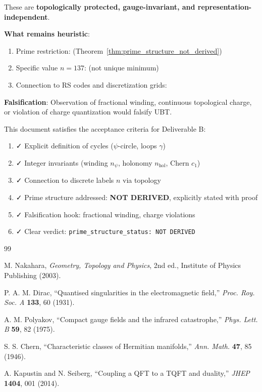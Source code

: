 \documentclass[12pt]{article}
\begin{document}
These are \textbf{topologically protected, gauge-invariant, and representation-independent}.

\textbf{What remains heuristic}:
\begin{enumerate}
    \item Prime restriction:  (Theorem~\ref{thm:prime_structure_not_derived})
    \item Specific value $n=137$:  (not unique minimum)
    \item Connection to RS codes and discretization grids: 
\end{enumerate}

\textbf{Falsification}: Observation of fractional winding, continuous topological charge, or violation of charge quantization would falsify UBT.

This document satisfies the acceptance criteria for Deliverable B:
\begin{enumerate}
    \item ✓ Explicit definition of cycles ($\psi$-circle, loops $\gamma$)
    \item ✓ Integer invariants (winding $n_\psi$, holonomy $n_{\text{hol}}$, Chern $c_1$)
    \item ✓ Connection to discrete labels $n$ via topology
    \item ✓ Prime structure addressed: \textbf{NOT DERIVED}, explicitly stated with proof
    \item ✓ Falsification hook: fractional winding, charge violations
    \item ✓ Clear verdict: \texttt{prime\_structure\_status: NOT DERIVED}
\end{enumerate}


\begin{thebibliography}{99}

M. Nakahara, \textit{Geometry, Topology and Physics}, 2nd ed., Institute of Physics Publishing (2003).

P. A. M. Dirac, ``Quantised singularities in the electromagnetic field,'' \textit{Proc. Roy. Soc. A} \textbf{133}, 60 (1931).

A. M. Polyakov, ``Compact gauge fields and the infrared catastrophe,'' \textit{Phys. Lett. B} \textbf{59}, 82 (1975).

S. S. Chern, ``Characteristic classes of Hermitian manifolds,'' \textit{Ann. Math.} \textbf{47}, 85 (1946).

A. Kapustin and N. Seiberg, ``Coupling a QFT to a TQFT and duality,'' \textit{JHEP} \textbf{1404}, 001 (2014).

\end{thebibliography}
\end{document}
